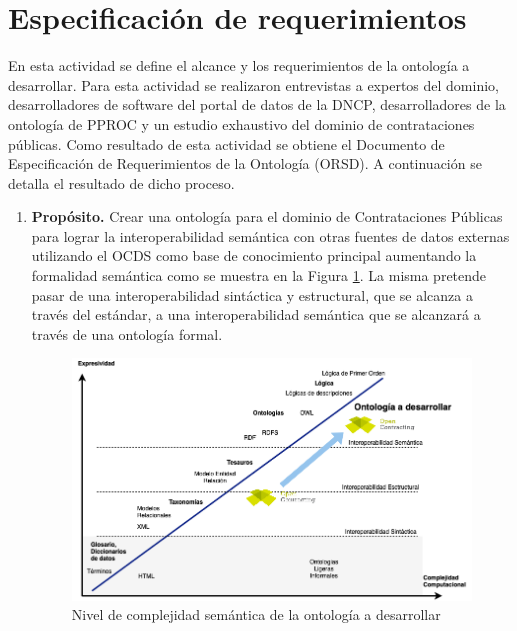 \section{Especificación de requerimientos}

En esta actividad se define el alcance y los requerimientos de la ontología a desarrollar. Para esta actividad se realizaron entrevistas a expertos del dominio, desarrolladores de software del portal de datos de la DNCP, desarrolladores de la  ontología de PPROC y un estudio exhaustivo del dominio de contrataciones públicas. Como resultado de esta actividad se obtiene el Documento de Especificación de Requerimientos de la Ontología (ORSD). A continuación se detalla el resultado de dicho proceso.
\begin{enumerate}
    
\item \textbf{Propósito.} Crear una ontología para el dominio de Contrataciones Públicas para lograr la interoperabilidad semántica con otras fuentes de datos externas utilizando el OCDS como base de conocimiento principal aumentando la formalidad semántica como se muestra en la Figura \ref{img:ocds-ocntology-complejidad}. La misma pretende pasar de una interoperabilidad sintáctica y estructural, que se alcanza a través del estándar, a una interoperabilidad semántica que se alcanzará a través de una ontología formal.

\begin{figure}[htbp!]
\centering
\includegraphics[width=150mm]{figuras/Diagramas-OenContracting.png}
\caption{Nivel de complejidad semántica de la ontología a desarrollar}
\label{img:ocds-ocntology-complejidad}
\end{figure}



\end{enumerate}
